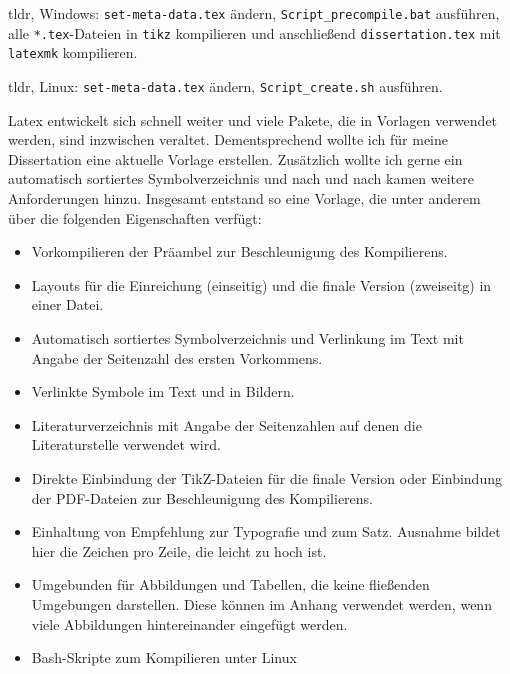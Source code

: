 
tldr, Windows: \texttt{set-meta-data.tex} ändern, \texttt{Script\_precompile.bat} ausführen, alle \texttt{*.tex}-Dateien in \texttt{tikz} kompilieren und anschließend \texttt{dissertation.tex} mit \texttt{latexmk} kompilieren.

tldr, Linux: \texttt{set-meta-data.tex} ändern, \texttt{Script\_create.sh} ausführen.

Latex entwickelt sich schnell weiter und viele Pakete, die in Vorlagen verwendet werden, sind inzwischen veraltet. Dementsprechend wollte ich für meine Dissertation eine aktuelle Vorlage erstellen. Zusätzlich wollte ich gerne ein automatisch sortiertes Symbolverzeichnis und nach und nach kamen weitere Anforderungen hinzu. Insgesamt entstand so eine Vorlage, die unter anderem über die folgenden Eigenschaften verfügt:

\begin{itemize}
	\item Vorkompilieren der Präambel zur Beschleunigung des Kompilierens.
	\item Layouts für die Einreichung (einseitig) und die finale Version (zweiseitg) in einer Datei.
	\item Automatisch sortiertes Symbolverzeichnis und Verlinkung im Text mit Angabe der Seitenzahl des ersten Vorkommens.
	\item Verlinkte Symbole im Text und in Bildern.
	\item Literaturverzeichnis mit Angabe der Seitenzahlen auf denen die Literaturstelle verwendet wird.
	\item Direkte Einbindung der TikZ-Dateien für die finale Version oder Einbindung der PDF-Dateien zur Beschleunigung des Kompilierens.
	\item Einhaltung von Empfehlung zur Typografie und zum Satz. Ausnahme bildet hier die Zeichen pro Zeile, die leicht zu hoch ist.
	\item Umgebunden für Abbildungen und Tabellen, die keine fließenden Umgebungen darstellen. Diese können im Anhang verwendet werden, wenn viele Abbildungen hintereinander eingefügt werden.
	\item Bash-Skripte zum Kompilieren unter Linux
\end{itemize}